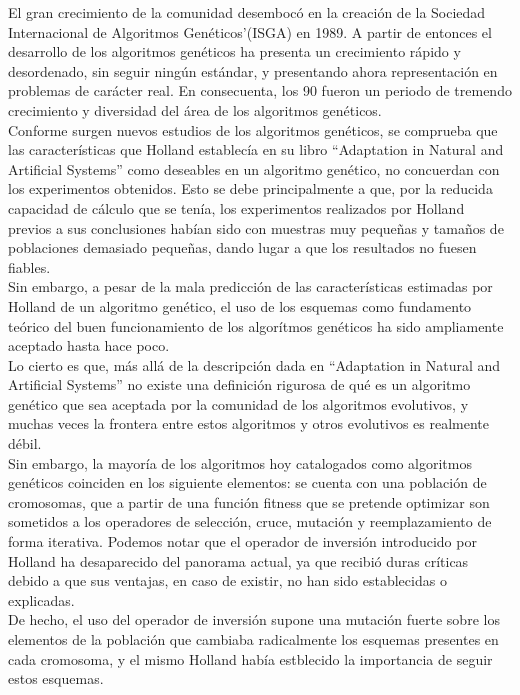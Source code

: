 \documentclass[12pt]{article} \usepackage[utf8x]{inputenc}
\begin{document}
El gran crecimiento de la comunidad desembocó en la creación de la Sociedad Internacional de 
Algoritmos Genéticos'(ISGA) en 1989. A partir de entonces el desarrollo de los algoritmos 
genéticos ha presenta un crecimiento rápido y desordenado, sin seguir ningún estándar, y presentando
ahora representación en problemas de carácter real. En consecuenta, los 90 fueron un periodo de tremendo
crecimiento y diversidad del área de los algoritmos genéticos. \\


Conforme surgen nuevos estudios de los algoritmos genéticos, se comprueba que las características
que Holland establecía en su libro ``Adaptation in Natural and Artificial Systems'' como deseables
en un algoritmo genético, no concuerdan con los experimentos obtenidos. Esto se debe principalmente
a que, por la reducida capacidad de cálculo que se tenía, los experimentos realizados por Holland
previos a sus conclusiones habían sido con muestras muy pequeñas y tamaños de poblaciones demasiado
pequeñas, dando lugar a que los resultados no fuesen fiables. \\

Sin embargo, a pesar de la mala predicción de las características estimadas por Holland de un 
algoritmo genético, el uso de los esquemas como fundamento teórico del buen funcionamiento de los
algorítmos genéticos ha sido ampliamente aceptado hasta hace poco.\\


Lo cierto es que, más allá de la descripción dada en ``Adaptation in Natural and Artificial Systems''
no existe una definición rigurosa de qué es un algoritmo genético que sea aceptada por la comunidad de los 
algoritmos evolutivos, y muchas veces la frontera entre estos algoritmos y otros evolutivos es
realmente débil. \\

Sin embargo, la mayoría de los algoritmos hoy catalogados como algoritmos genéticos coinciden en los 
siguiente elementos: se cuenta con una población de cromosomas, que a partir de una función fitness
que se pretende optimizar son sometidos a los operadores de selección, cruce, mutación y reemplazamiento
de forma iterativa. Podemos notar que el operador de inversión introducido por Holland ha desaparecido 
del panorama actual, ya que recibió duras críticas debido a que sus ventajas, en caso de existir, no han 
sido establecidas o explicadas.\\

De hecho, el uso del operador de inversión supone una mutación fuerte sobre los elementos de la población
que cambiaba radicalmente los esquemas presentes en cada cromosoma, y el mismo Holland había estblecido
la importancia de seguir estos esquemas.\\
\end{document}
